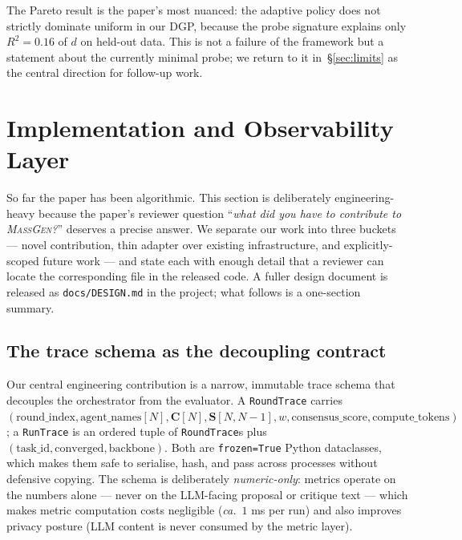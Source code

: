 \documentclass[10pt,a4paper]{article}
\begin{document}
The Pareto result is the paper's most nuanced: the adaptive policy does not
strictly dominate uniform in our DGP, because the probe signature explains
only $R^2\!=\!0.16$ of $d$ on held-out data. This is not a failure of the
framework but a statement about the currently minimal probe; we return to it
in~\S\ref{sec:limits} as the central direction for follow-up work.

\section{Implementation and Observability Layer}\label{sec:impl}

So far the paper has been algorithmic. This section is deliberately
engineering-heavy because the paper's reviewer question
``\emph{what did you have to contribute to \textsc{MassGen}?}'' deserves a
precise answer. We separate our work into three buckets --- novel
contribution, thin adapter over existing infrastructure, and explicitly-scoped
future work --- and state each with enough detail that a reviewer can locate
the corresponding file in the released code. A fuller design document is
released as \texttt{docs/DESIGN.md} in the project; what follows is a
one-section summary.

\subsection{The trace schema as the decoupling contract}

Our central engineering contribution is a narrow, immutable trace schema
that decouples the orchestrator from the evaluator. A \texttt{RoundTrace}
carries
$(\mathrm{round\_index}, \mathrm{agent\_names}[N],
\mathbf{C}[N], \mathbf{S}[N,N{-}1], w, \mathrm{consensus\_score},
\mathrm{compute\_tokens})$;
a \texttt{RunTrace} is an ordered tuple of \texttt{RoundTrace}s plus
$(\mathrm{task\_id}, \mathrm{converged}, \mathrm{backbone})$. Both are
\texttt{frozen=True} Python dataclasses, which makes them safe to serialise,
hash, and pass across processes without defensive copying. The schema is
deliberately \emph{numeric-only}: metrics operate on the numbers alone ---
never on the LLM-facing proposal or critique text --- which makes metric
computation costs negligible (\textit{ca.}\ $1$ ms per run) and also
improves privacy posture (LLM content is never consumed by the metric layer).
\end{document}
